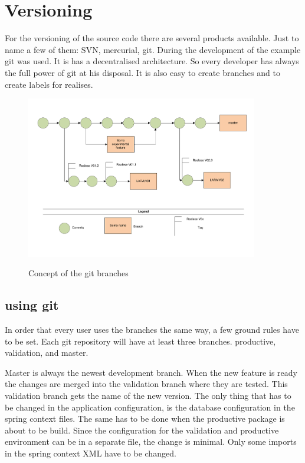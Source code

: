 \documentclass[paper=a4,twoside=false,BCOR=0mm,DIV=calc,fontsize=12pt]{scrartcl}
\begin{document}
\section{Versioning}
For the versioning of the source code there are several products available. Just to name a few of them: SVN, mercurial, git.
During the development of the example git was used. It is has a decentralised architecture. So every developer has always the full power of git at his disposal. It is also easy to create branches and to create labels for realises.

\begin{figure}
    \begin{center}
       \includegraphics[width=0.9\textwidth]{./img/gitversioning.pdf}\\
    \end{center}
  \caption{Concept of the git branches}
  \label{gitbranchconcept}
\end{figure} 

\subsection{using git}
In order that every user uses the branches the same way, a few ground rules have to be set.
Each git repository will have at least three branches. productive, validation, and master.

Master is always the newest development branch. When the new feature is ready the changes are merged into the validation branch where they are tested. This validation branch gets the name of the new version.
The only thing that has to be changed in the application configuration, is the database configuration in the spring context files.
The same has to be done when the productive package is about to be build. Since the configuration for the validation and productive 
environment can be in a separate file, the change is minimal. Only some imports in the spring context XML have to be changed.
\end{document}
